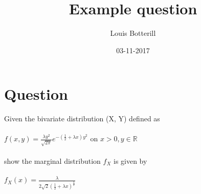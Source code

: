 \documentclass[11pt]{article}   	%
\title{Example question}
\author{Louis Botterill}
\date{03-11-2017}					%
\begin{document}
\maketitle

\pagebreak


\section*{Question}

Given the bivariate distribution (X, Y) defined as \\
\\
$ f(x, y) = \frac{\lambda y^2}{\sqrt { 2 \pi } } e^{-( \frac{1}{2} + \lambda x) y^2 } $ on $ x > 0, y \in \mathbb{R} $  \\
\\
show the marginal distribution $f_X$ is given by \\
\\
$ f_X(x) = \frac{\lambda}{2 \sqrt{2} (\frac{1}{2} + \lambda x)^{\frac{3}{2}} } $ \\
\end{document}
